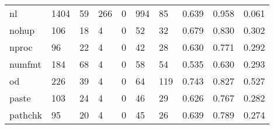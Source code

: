 \begin{longtable}{lp{2.0cm}p{2.0cm}p{2.0cm}p{2.0cm}p{2.0cm}p{2.0cm}p{2.0cm}p{2.0cm}p{2.0cm}}
nl        &                   1404 &                                 59 &                               266 &                                0 &                               994 &                              85 &                                0.639 &                                  0.958 &                                0.061 \\
nohup     &                    106 &                                 18 &                                 4 &                                0 &                                52 &                              32 &                                0.679 &                                  0.830 &                                0.302 \\
nproc     &                     96 &                                 22 &                                 4 &                                0 &                                42 &                              28 &                                0.630 &                                  0.771 &                                0.292 \\
numfmt    &                    184 &                                 68 &                                 4 &                                0 &                                58 &                              54 &                                0.535 &                                  0.630 &                                0.293 \\
od        &                    226 &                                 39 &                                 4 &                                0 &                                64 &                             119 &                                0.743 &                                  0.827 &                                0.527 \\
paste     &                    103 &                                 24 &                                 4 &                                0 &                                46 &                              29 &                                0.626 &                                  0.767 &                                0.282 \\
pathchk   &                     95 &                                 20 &                                 4 &                                0 &                                45 &                              26 &                                0.639 &                                  0.789 &                                0.274 \\

\end{longtable}
